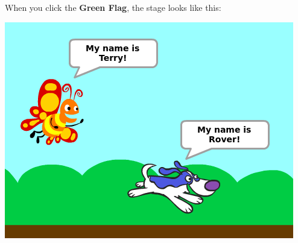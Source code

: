 \documentclass[letterpaper,12pt]{article}
\begin{document}
\newpage
\noindent When you click the \textbf{Green Flag}, the stage looks like this:
\begin{center}
\includegraphics[scale=.5]{q4_stage.png}
\end{center}
\end{document}
